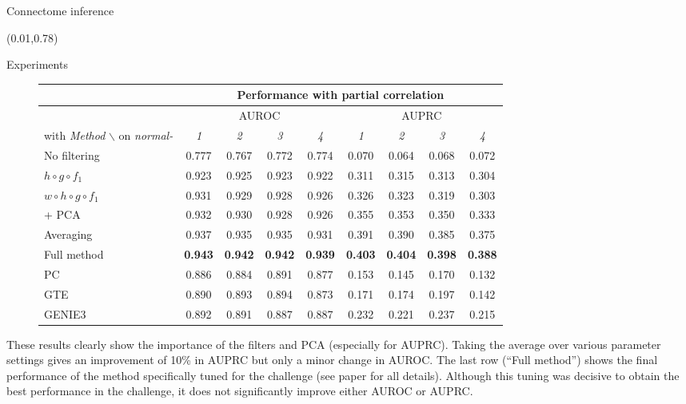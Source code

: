 \documentclass[final]{beamer}
\begin{document}
\begin{frame}{}
\begin{textblock}{0.485}
\begin{block}{Connectome inference \phantom{p}}
\end{block}

\end{textblock}


\begin{textblock}{0.69}(0.01,0.78)

\begin{block}{Experiments \phantom{p}}

\vspace{-5pt}
\begin{figure}
\centering
\tiny
\begin{tabular}{| l | c c c c | c c c c |}
\hline
& \multicolumn{8}{c|}{Performance with partial correlation}\\ \hline
& \multicolumn{4}{c|}{AUROC} & \multicolumn{4}{c|}{AUPRC} \\
with \textit{Method} $\backslash$ on \textit{normal-} & \textit{1} & \textit{2} & \textit{3} & \textit{4} & \textit{1} & \textit{2} & \textit{3} & \textit{4} \\
\hline
\hline
No  filtering       					& 0.777 & 0.767 & 0.772 & 0.774 & 0.070 & 0.064 & 0.068 & 0.072\\
$ h \circ g \circ f_1$                  & 0.923 & 0.925 & 0.923 & 0.922 & 0.311 & 0.315 & 0.313 & 0.304\\
$ w \circ h \circ g \circ f_1$          & 0.931 & 0.929 & 0.928 & 0.926 & 0.326 & 0.323 & 0.319 & 0.303\\
+ PCA         							& 0.932 & 0.930 & 0.928 & 0.926 & 0.355 & 0.353 & 0.350 & 0.333\\
Averaging           					& 0.937 & 0.935 & 0.935 & 0.931 & 0.391 &  0.390 &  0.385 & 0.375\\
Full method           					& \textbf{0.943} & \textbf{0.942} & \textbf{0.942} & \textbf{0.939} & \textbf{0.403} & \textbf{0.404} & \textbf{0.398} & \textbf{0.388}\\
\hline
PC & 0.886 & 0.884 & 0.891 &  0.877 & 0.153 & 0.145 & 0.170 & 0.132\\
GTE & 0.890 & 0.893 & 0.894 & 0.873 & 0.171 & 0.174 & 0.197 & 0.142\\
GENIE3 & 0.892 & 0.891 & 0.887 & 0.887 & 0.232 & 0.221 & 0.237 & 0.215 \\
\hline
\end{tabular}
\end{figure}

These results clearly show the importance of the filters and PCA (especially for AUPRC). Taking the average over
various parameter settings gives an improvement of 10\% in AUPRC but
only a minor change in AUROC. The last row (``Full method'') shows the
final performance of the method specifically tuned for the challenge
(see paper for all details). Although this
tuning was decisive to obtain the best performance in the challenge,
it does not significantly improve either AUROC or AUPRC.


\end{block}
\end{textblock}
\end{frame}
\end{document}

